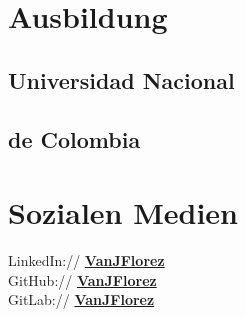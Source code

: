 \documentclass[]{CV-JuanCamiloFlorez}
\begin{document}
%
%
\lastupdated

%
%

%
%
\begin{minipage}[t]{0.33\textwidth} 

\section{Ausbildung} 
\subsection{Universidad Nacional}
\subsection{de Colombia}
\sectionsep

\section{Sozialen Medien}
    LinkedIn:// \href{https://www.linkedin.com/in/vanjflores/}{\bf VanJFlorez} \\
    GitHub:// \href{https://github.com/jcammmmm}{\bf VanJFlorez} \\
    GitLab:// \href{https://gitlab.com/VanJFlorez}{\bf VanJFlorez} \\
\sectionsep


\end{minipage}
\end{document}
